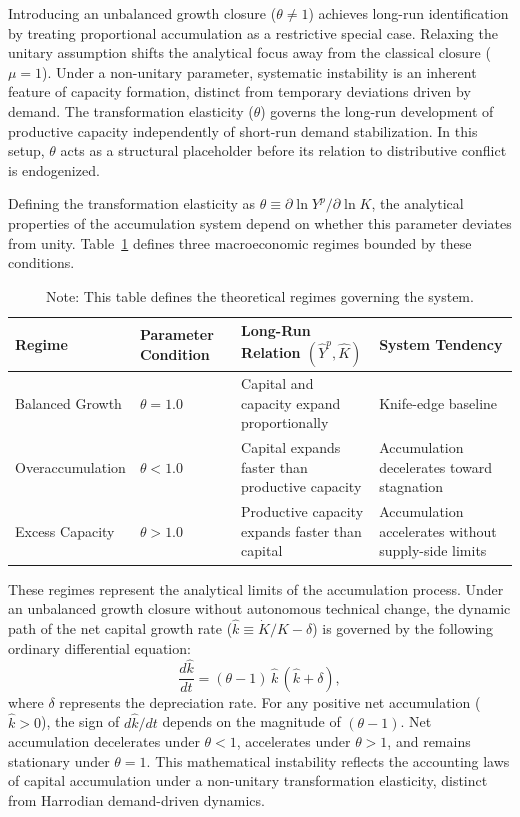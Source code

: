 \documentclass[11pt]{article}
\begin{document}
Introducing an unbalanced growth closure ($\theta \neq 1$) achieves long-run identification by treating proportional accumulation as a restrictive special case. Relaxing the unitary assumption shifts the analytical focus away from the classical closure ($\mu = 1$). Under a non-unitary parameter, systematic instability is an inherent feature of capacity formation, distinct from temporary deviations driven by demand. The transformation elasticity ($\theta$) governs the long-run development of productive capacity independently of short-run demand stabilization. In this setup, $\theta$ acts as a structural placeholder before its relation to distributive conflict is endogenized.

Defining the transformation elasticity as $\theta \equiv \partial \ln Y^p / \partial \ln K$, the analytical properties of the accumulation system depend on whether this parameter deviates from unity. Table~\ref{tab:growth_regimes} defines three macroeconomic regimes bounded by these conditions.

\begin{table}[H]
\centering
\caption{Accumulation Regimes and the Productive-Capacity Relation}
\label{tab:growth_regimes}
\small
\begin{tabular}{@{}>{\raggedright\arraybackslash}p{3.2cm}>{\centering\arraybackslash}p{1.8cm}>{\raggedright\arraybackslash}p{4.2cm}>{\raggedright\arraybackslash}p{4.0cm}@{}}
\toprule
Regime & Parameter Condition & Long-Run Relation $(\hat{Y}^p,\hat{K})$ & System Tendency \\
\midrule
\midrule
Balanced Growth & $\theta = 1.0$ & Capital and capacity expand proportionally & Knife-edge baseline \\
Overaccumulation & $\theta < 1.0$ & Capital expands faster than productive capacity & Accumulation decelerates toward stagnation \\
Excess Capacity & $\theta > 1.0$ & Productive capacity expands faster than capital & Accumulation accelerates without supply-side limits \\
\bottomrule
\end{tabular}
\caption*{\small Note: This table defines the theoretical regimes governing the system.}
\end{table}

These regimes represent the analytical limits of the accumulation process. Under an unbalanced growth closure without autonomous technical change, the dynamic path of the net capital growth rate ($\hat{k} \equiv \dot{K}/K - \delta$) is governed by the following ordinary differential equation:
\begin{equation}
\label{eq:ode_dynamics}
\frac{d\hat{k}}{dt} = (\theta - 1)\,\hat{k}\,(\hat{k}+\delta),
\end{equation}
where $\delta$ represents the depreciation rate. For any positive net accumulation ($\hat{k} > 0$), the sign of $d\hat{k}/dt$ depends on the magnitude of $(\theta - 1)$. Net accumulation decelerates under $\theta < 1$, accelerates under $\theta > 1$, and remains stationary under $\theta = 1$. This mathematical instability reflects the accounting laws of capital accumulation under a non-unitary transformation elasticity, distinct from Harrodian demand-driven dynamics.
\end{document}
